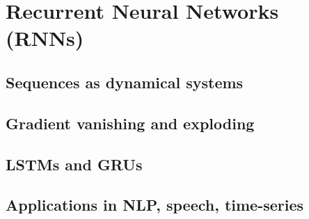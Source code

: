 ﻿\chapter{Recurrent Neural Networks (RNNs)}
\section{Sequences as dynamical systems}

\section{Gradient vanishing and exploding}

\section{LSTMs and GRUs}

\section{Applications in NLP, speech, time-series}


